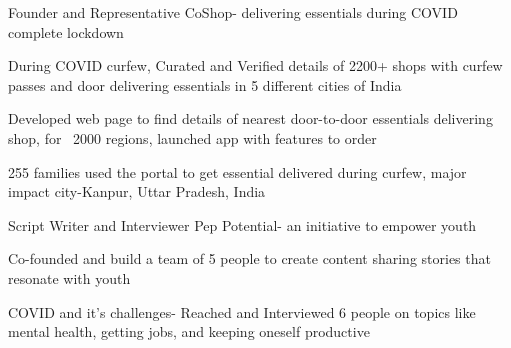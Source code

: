 

\begin{cventries}

\cventry
    {Founder and Representative} %
    {CoShop- delivering essentials during COVID complete lockdown   } %
    {} %
    {} %
    {
      \begin{cvitems} %
        \item {During COVID curfew, Curated and Verified details of 2200+ shops with curfew passes and door delivering essentials in 5 different cities of India}
        \item {Developed web page to find details of nearest door-to-door essentials delivering shop, for ~2000 regions, launched app with features to order}
        \item {255 families used the portal to get essential delivered during curfew, major impact city-Kanpur, Uttar Pradesh, India}
      \end{cvitems}
    }   
\cventry
    {Script Writer and Interviewer} %
    {Pep Potential- an initiative to empower youth  } %
    {} %
    {} %
    {
      \begin{cvitems} %
        \item {Co-founded and build a team of 5 people to create content sharing stories that resonate with youth}
        \item {COVID and it's challenges- Reached and Interviewed 6 people on topics like mental health, getting jobs, and keeping oneself productive}
        \end{cvitems}
    }
\cventry
\end{cventries}

